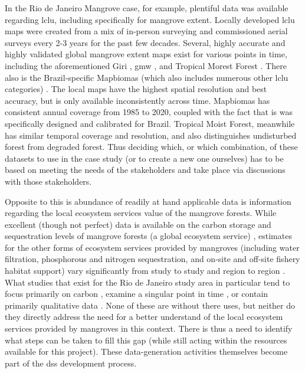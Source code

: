 \documentclass[notitlepage]{article}
\begin{document}
In the Rio de Janeiro Mangrove case, for example, plentiful data was available regarding \ac{lclu}, including specifically for mangrove extent. Locally developed \ac{lclu} maps were created from a mix of in-person surveying and commissioned aerial surveys every 2-3 years for the past few decades. Several, highly accurate and highly validated global mangrove extent maps exist for various points in time, including the aforementioned Giri \cite{giriStatusDistributionMangrove2011}, \ac{gmw} \cite{buntingGlobalMangroveWatch2018}, and Tropical Morest Forest \cite{vancutsemLongterm199020192021}. There also is the Brazil-specific Mapbiomas (which also includes numerous other \ac{lclu} categories) \cite{souzaReconstructingThreeDecades2020}. The local maps have the highest spatial resolution and best accuracy, but is only available inconsistently across time. Mapbiomas has consistent annual coverage from 1985 to 2020, coupled with the fact that is was specifically designed and calibrated for Brazil. Tropical Moist Forest, meanwhile has similar temporal coverage and resolution, and also distinguishes undisturbed forest from degraded forest. Thus deciding which, or which combination, of these datasets to use in the case study (or to create a new one ourselves) has to be based on meeting the needs of the stakeholders and take place via discussions with those stakeholders.

Opposite to this is abundance of readily at hand applicable data is information regarding the local ecosystem services value of the mangrove forests. While excellent (though not perfect) data is available on the carbon storage and sequestration levels of mangrove forests (a global ecosystem service) \cite{donatoMangrovesMostCarbonrich2011, simardMangroveCanopyHeight2019}, estimates for the other forms of ecosystem services provided by mangroves (including water filtration, phosphorous and nitrogen sequestration, and on-site and off-site fishery habitat support) vary significantly from study to study and region to region \cite{faillerValuationMarineCoastal2015, huxhamApplyingClimateCompatible2015, souzaEcologicalEconomicValuation2011, tannerMangrovesGalapagosEcosystem2019}. What studies that exist for the Rio de Janeiro study area in particular tend to focus primarily on carbon \cite{estradaEconomicEvaluationCarbon2015}, examine a singular point in time \cite{estradaEconomicEvaluationCarbon2015, herzogGuaratibaVerdeSubsidios2009}, or contain primarily qualitative data \cite{herzogGuaratibaVerdeSubsidios2009}. None of these are without there uses, but neither do they directly address the need for a better understand of the local ecosystem services provided by mangroves in this context. There is thus a need to identify what steps can be taken to fill this gap (while still acting within the resources available for this project). These data-generation activities themselves become part of the \ac{dss} development process.
\end{document}
